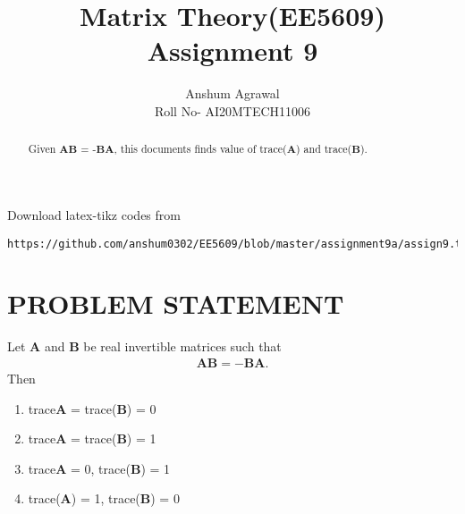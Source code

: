 \documentclass[journal,12pt,twocolumn]{IEEEtran}
\begin{document}
\makeatother
\let\StandardTheFigure\thefigure
\let\vec\mathbf
\renewcommand{\thefigure}{\theproblem}
\def\putbox#1#2#3{\makebox[0in][l]{\makebox[#1][l]{}\raisebox{\baselineskip}[0in][0in]{\raisebox{#2}[0in][0in]{#3}}}}
     \def\rightbox#1{\makebox[0in][r]{#1}}
     \def\centbox#1{\makebox[0in]{#1}}
     \def\topbox#1{\raisebox{-\baselineskip}[0in][0in]{#1}}
     \def\midbox#1{\raisebox{-0.5\baselineskip}[0in][0in]{#1}}
\vspace{3cm}
\title{Matrix Theory(EE5609) Assignment 9}
\author{Anshum Agrawal \\ Roll No- AI20MTECH11006}
%
\maketitle
\newpage
\bigskip
\renewcommand{\thefigure}{\theenumi}
\renewcommand{\thetable}{\arabic{table}}
\begin{abstract}
Given $\vec{A}\vec{B}$ = -$\vec{B}\vec{A}$, this documents finds value of trace($\vec{A}$) and trace($\vec{B}$).   
\end{abstract}
%
Download latex-tikz codes from 
%
\begin{lstlisting}
https://github.com/anshum0302/EE5609/blob/master/assignment9a/assign9.tex
\end{lstlisting}
%
\section{\textbf{PROBLEM STATEMENT}}
Let $\vec{A}$ and $\vec{B}$ be real invertible matrices such that 
\begin{align}
    \vec{AB}=-\vec{BA}\label{eq1}.
\end{align}
Then
\begin{enumerate}
    \item trace{$\vec{A}$} = trace($\vec{B}$) = 0
    \item trace{$\vec{A}$} = trace($\vec{B}$) = 1
    \item trace{$\vec{A}$} = 0, trace($\vec{B}$) = 1
    \item trace($\vec{A}$) = 1, trace($\vec{B}$) = 0
\end{enumerate}
\end{document}
